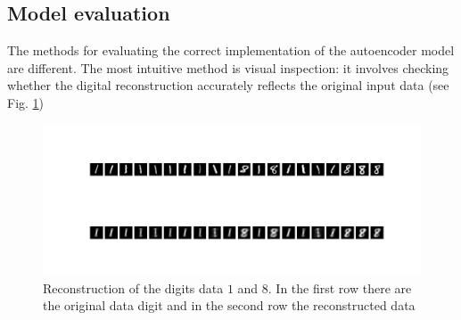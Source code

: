 \documentclass[9pt,technote]{IEEEtran}
\begin{document}
\subsection{Model evaluation}
The methods for evaluating the correct implementation of the autoencoder model are different.
The most intuitive method is visual inspection: it involves checking whether the digital reconstruction accurately reflects the original input data (see Fig. \ref{fig:digitalrecostruction})
\begin{figure}
	\centering
	\includegraphics[width=0.7\linewidth]{Resources/DigitalRecostruction}
	\caption{Reconstruction of the digits data $1$ and $8$. In the first row there are the original data digit and in the second row the reconstructed data}
	\label{fig:digitalrecostruction}
\end{figure}
\end{document}
